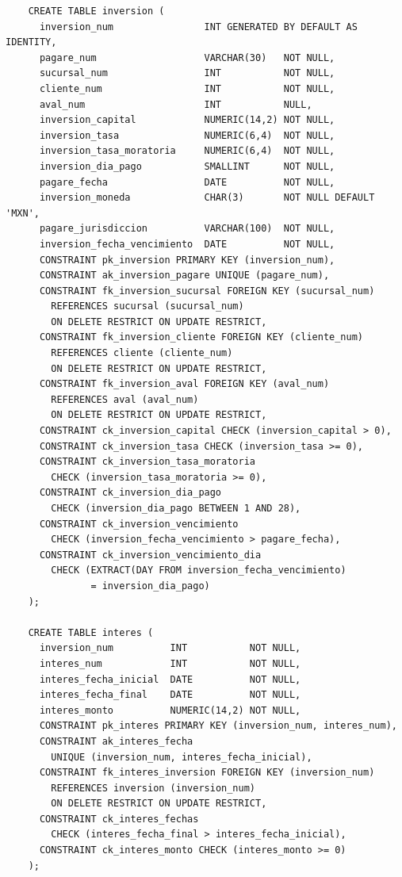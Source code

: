 \begin{verbatim}
	CREATE TABLE inversion (
	  inversion_num                INT GENERATED BY DEFAULT AS IDENTITY,
	  pagare_num                   VARCHAR(30)   NOT NULL,
	  sucursal_num                 INT           NOT NULL,
	  cliente_num                  INT           NOT NULL,
	  aval_num                     INT           NULL,
	  inversion_capital            NUMERIC(14,2) NOT NULL,
	  inversion_tasa               NUMERIC(6,4)  NOT NULL,
	  inversion_tasa_moratoria     NUMERIC(6,4)  NOT NULL,
	  inversion_dia_pago           SMALLINT      NOT NULL,
	  pagare_fecha                 DATE          NOT NULL,
	  inversion_moneda             CHAR(3)       NOT NULL DEFAULT 'MXN',
	  pagare_jurisdiccion          VARCHAR(100)  NOT NULL,
	  inversion_fecha_vencimiento  DATE          NOT NULL,
	  CONSTRAINT pk_inversion PRIMARY KEY (inversion_num),
	  CONSTRAINT ak_inversion_pagare UNIQUE (pagare_num),
	  CONSTRAINT fk_inversion_sucursal FOREIGN KEY (sucursal_num)
	    REFERENCES sucursal (sucursal_num)
	    ON DELETE RESTRICT ON UPDATE RESTRICT,
	  CONSTRAINT fk_inversion_cliente FOREIGN KEY (cliente_num)
	    REFERENCES cliente (cliente_num)
	    ON DELETE RESTRICT ON UPDATE RESTRICT,
	  CONSTRAINT fk_inversion_aval FOREIGN KEY (aval_num)
	    REFERENCES aval (aval_num)
	    ON DELETE RESTRICT ON UPDATE RESTRICT,
	  CONSTRAINT ck_inversion_capital CHECK (inversion_capital > 0),
	  CONSTRAINT ck_inversion_tasa CHECK (inversion_tasa >= 0),
	  CONSTRAINT ck_inversion_tasa_moratoria
	    CHECK (inversion_tasa_moratoria >= 0),
	  CONSTRAINT ck_inversion_dia_pago
	    CHECK (inversion_dia_pago BETWEEN 1 AND 28),
	  CONSTRAINT ck_inversion_vencimiento
	    CHECK (inversion_fecha_vencimiento > pagare_fecha),
	  CONSTRAINT ck_inversion_vencimiento_dia
	    CHECK (EXTRACT(DAY FROM inversion_fecha_vencimiento)
	           = inversion_dia_pago)
	);

	CREATE TABLE interes (
	  inversion_num          INT           NOT NULL,
	  interes_num            INT           NOT NULL,
	  interes_fecha_inicial  DATE          NOT NULL,
	  interes_fecha_final    DATE          NOT NULL,
	  interes_monto          NUMERIC(14,2) NOT NULL,
	  CONSTRAINT pk_interes PRIMARY KEY (inversion_num, interes_num),
	  CONSTRAINT ak_interes_fecha
	    UNIQUE (inversion_num, interes_fecha_inicial),
	  CONSTRAINT fk_interes_inversion FOREIGN KEY (inversion_num)
	    REFERENCES inversion (inversion_num)
	    ON DELETE RESTRICT ON UPDATE RESTRICT,
	  CONSTRAINT ck_interes_fechas
	    CHECK (interes_fecha_final > interes_fecha_inicial),
	  CONSTRAINT ck_interes_monto CHECK (interes_monto >= 0)
	);


\end{verbatim}
